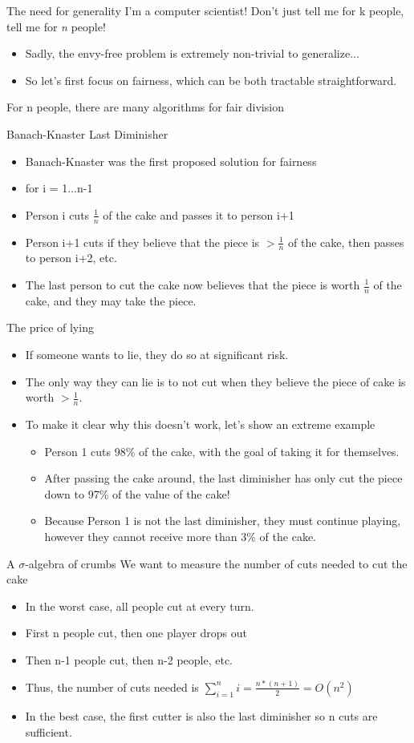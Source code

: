 \documentclass[t]{beamer}
\newcommand{\ite}{\item[\ding{118}]}
\begin{document}
\begin{frame}{The need for generality}
	I'm a computer scientist! Don't just tell me for k people, tell me for \textit{n} people! \pause
	\begin{itemize}
		\ite Sadly, the envy-free problem is extremely non-trivial to generalize...
		\ite So let's first focus on fairness, which can be both tractable straightforward.
	\end{itemize}
	For n people, there are many algorithms for fair division
\end{frame}

\begin{frame}{Banach-Knaster Last Diminisher}
	\begin{itemize}
		\ite Banach-Knaster was the first proposed solution for fairness
		\ite for i = 1...n-1
		\ite Person i cuts $\frac{1}{n}$ of the cake and passes it to person i+1
		\ite Person i+1 cuts if they believe that the piece is $> \frac{1}{n}$ of the cake, then passes to person i+2, etc.
		\ite The last person to cut the cake now believes that the piece is worth $\frac{1}{n}$ of the cake, and 
		they may take the piece.
	\end{itemize}
\end{frame}

\begin{frame}{The price of lying}
	\begin{itemize}
		\ite If someone wants to lie, they do so at significant risk.
		\ite The only way they can lie is to not cut when they believe the piece of cake is worth $> \frac{1}{n}$. 
		
		\ite To make it clear why this doesn't work, let's show an extreme example
		\begin{itemize}
			\ite Person 1 cuts 98\% of the cake, with the goal of taking it for themselves.
			\ite After passing the cake around, the last diminisher has only cut the piece down to 97\% of the value of the cake!
			\ite Because Person 1 is not the last diminisher, they must continue playing, however they cannot receive more than 3\% of the cake.
		\end{itemize}
	\end{itemize}
\end{frame}

\begin{frame}{A $\sigma$-algebra of crumbs}
	We want to measure the number of cuts needed to cut the cake
	\begin{itemize}
		\ite In the worst case, all people cut at every turn.
		\ite First n people cut, then one player drops out
		\ite Then n-1 people cut, then n-2 people, etc.
		\ite Thus, the number of cuts needed is $\sum\limits_{i=1}^{n}i = \frac{n \ast (n+1)}{2} = O(n^2)$
		\ite In the best case, the first cutter is also the last diminisher so n cuts are sufficient.
	\end{itemize}
\end{frame}
\end{document}
